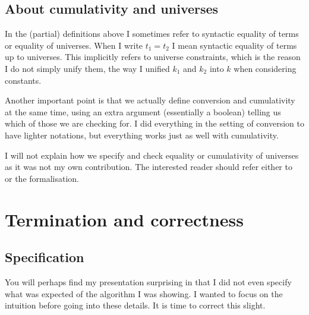 \subsection{About cumulativity and universes}

In the (partial) definitions above I sometimes refer to syntactic equality of
terms or equality of universes. When I write \(t_1 = t_2\) I mean syntactic
equality of terms up to universes. This implicitly refers to universe
constraints, which is the reason I do not simply unify them, the way I unified
\(k_1\) and \(k_2\) into \(k\) when considering constants.

Another important point is that we actually define conversion and cumulativity
at the same time, using an extra argument (essentially a boolean) telling us
which of those we are checking for.
I did everything in the setting of conversion to have lighter notations, but
everything works just as well with cumulativity.

I will not explain how we specify and check equality or cumulativity of
universes as it was not my own contribution.
The interested reader should refer either to~ or the
formalisation.

\section{Termination and correctness}

\subsection{Specification}

You will perhaps find my presentation surprising in that I did not even specify
what was expected of the algorithm I was showing. I wanted to focus on the
intuition before going into these details.
It is time to correct this slight.

